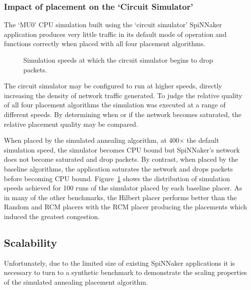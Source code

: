 			\subsubsection{Impact of placement on the `Circuit Simulator'}
				
				The `MU0' CPU simulation built using the `circuit simulator' SpiNNaker
				application produces very little traffic in its default mode of
				operation and functions correctly when placed with all four placement
				algorithms.
				
				\begin{figure}
					\center
					
					\caption[Packet dropping in `circuit simulator'.]%
					{Simulation speeds at which the circuit simulator begins to
					drop packets.}
					\label{fig:mu0-saturation}
				\end{figure}
				
				The circuit simulator may be configured to run at higher speeds,
				directly increasing the density of network traffic generated. To judge
				the relative quality of all four placement algorithms the simulation
				was executed at a range of different speeds. By determining when or if
				the network becomes saturated, the relative placement quality may be
				compared.
				
				When placed by the simulated annealing algorithm, at 400$\times$ the
				default simulation speed, the simulator becomes CPU bound but
				SpiNNaker's network does not become saturated and drop packets. By
				contrast, when placed by the baseline algorithms, the application
				saturates the network and drops packets before becoming CPU bound.
				Figure~\ref{fig:mu0-saturation} shows the distribution of simulation
				speeds achieved for 100 runs of the simulator placed by each baseline
				placer. As in many of the other benchmarks, the Hilbert placer performs
				better than the Random and RCM placers with the RCM placer producing
				the placements which induced the greatest congestion.
			
		\subsection{Scalability}
			
			Unfortunately, due to the limited size of existing SpiNNaker applications
			it is necessary to turn to a synthetic benchmark to demonstrate the
			scaling properties of the simulated annealing placement algorithm.
			
